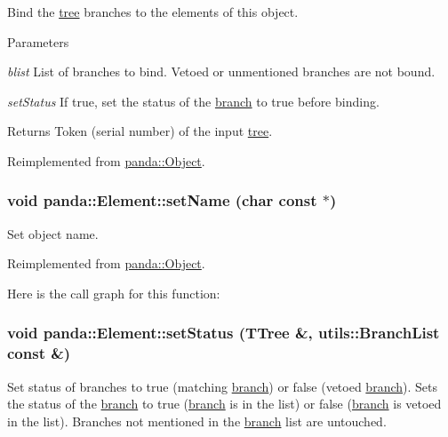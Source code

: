 Bind the \hyperlink{namespacepanda_1_1tree}{tree} branches to the elements of this object. 
\begin{DoxyParams}{Parameters}
\item[{\em blist}]List of branches to bind. Vetoed or unmentioned branches are not bound. \item[{\em setStatus}]If true, set the status of the \hyperlink{namespacepanda_1_1branch}{branch} to true before binding. \end{DoxyParams}
\begin{DoxyReturn}{Returns}
Token (serial number) of the input \hyperlink{namespacepanda_1_1tree}{tree}. 
\end{DoxyReturn}


Reimplemented from \hyperlink{classpanda_1_1Object_aed9f9d3b6abe518dd27957de843b36b5}{panda::Object}.\hypertarget{classpanda_1_1Element_a16bd41e0e8ade3508f5227533a9c4a03}{
\subsubsection[{setName}]{\setlength{\rightskip}{0pt plus 5cm}void panda::Element::setName (char const $\ast$)}}
\label{classpanda_1_1Element_a16bd41e0e8ade3508f5227533a9c4a03}


Set object name. 

Reimplemented from \hyperlink{classpanda_1_1Object_a7bba3813f78065be847cd8d85bab93fc}{panda::Object}.

Here is the call graph for this function:\hypertarget{classpanda_1_1Element_a86dead86ad366a92531c3e7f1f157994}{
\subsubsection[{setStatus}]{\setlength{\rightskip}{0pt plus 5cm}void panda::Element::setStatus (TTree \&, \/  {\bf utils::BranchList} const \&)}}
\label{classpanda_1_1Element_a86dead86ad366a92531c3e7f1f157994}


Set status of branches to true (matching \hyperlink{namespacepanda_1_1branch}{branch}) or false (vetoed \hyperlink{namespacepanda_1_1branch}{branch}). Sets the status of the \hyperlink{namespacepanda_1_1branch}{branch} to true (\hyperlink{namespacepanda_1_1branch}{branch} is in the list) or false (\hyperlink{namespacepanda_1_1branch}{branch} is vetoed in the list). Branches not mentioned in the \hyperlink{namespacepanda_1_1branch}{branch} list are untouched.


